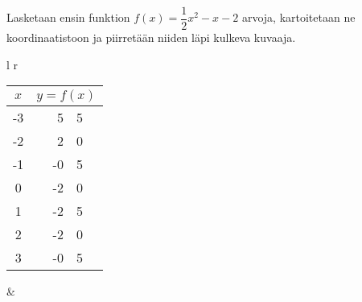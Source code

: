 \begin{esimerkki}
Lasketaan ensin funktion $f(x) = \dfrac{1}{2}x^2 - x - 2$ arvoja, kartoitetaan ne koordinaatistoon ja piirretään niiden läpi kulkeva kuvaaja.\\


\begin{tabular}[t]{l r}

\begin{tabular}{|c|r @{,} l|}
$x$ & \multicolumn{2}{c|}{$y=f(x)$} \\
\hline
-3 & 5&5 \\
-2 & 2&0 \\
-1 & -0&5 \\
0 & -2&0 \\
1 & -2&5 \\
2 & -2&0 \\
3 & -0&5 \\
\end{tabular}

&

\begin{kuvaajapohja}{0.75}{-4}{4}{-4}{6}
\
\end{kuvaajapohja}

\end{tabular}

\end{esimerkki}

%
%
%
%
%
%
%
%
%

